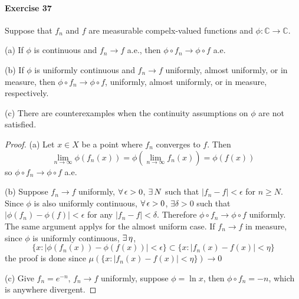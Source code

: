 \paragraph{Exercise 37}
Suppose that $f_n$ and $f$ are measurable compelx-valued functions and $\phi:\mathbb{C}\to\mathbb{C}$.
\par (a) If $\phi$ is continuous and $f_n\to f$ a.e., then $\phi\circ f_n\to\phi\circ f$ a.e.
\par (b) If $\phi$ is uniformly continuous and $f_n\to f$ uniformly, almost uniformly, or in measure, then $\phi\circ f_n\to\phi\circ f$, uniformly, almost uniformly, or in measure, respectively.
\par (c) There are counterexamples when the continuity assumptions on $\phi$ are not satisfied.
\begin{proof}
    \par (a) Let $x\in X$ be a point where $f_n$ converges to $f$. Then
    $$
    \lim_{n\to\infty}\phi(f_n(x))=\phi(\lim_{n\to\infty}f_n(x))=\phi(f(x))
    $$
    so $\phi\circ f_n\to\phi\circ f$ a.e.
    \par (b) Suppose $f_n\to f$ uniformly, $\forall\,\epsilon>0$, $\exists\, N$ such that $|f_n-f|<\epsilon$ for $n\ge N$. Since $\phi$ is also uniformly continuous, $\forall\,\epsilon>0$, $\exists \delta>0$ such that $|\phi(f_n)-\phi(f)|<\epsilon$ for any $|f_n-f|<\delta$. Therefore $\phi\circ f_n\to\phi\circ f$ uniformly. The same argument applys for the almost uniform case. If $f_n\to f$ in measure, since $\phi$ is uniformly continuous, $\exists\,\eta$,
    $$
    \{x:|\phi(f_n(x))-\phi(f(x))|<\epsilon\}\subset \{x:|f_n(x)-f(x)|<\eta\}
    $$
    the proof is done since $\mu(\{x:|f_n(x)-f(x)|<\eta\})\to 0$
    \par (c) Give $f_n=e^{-n}$, $f_n\to f$ uniformly, suppose $\phi=\ln x$, then $\phi\circ f_n=-n$, which is anywhere divergent.
\end{proof}
